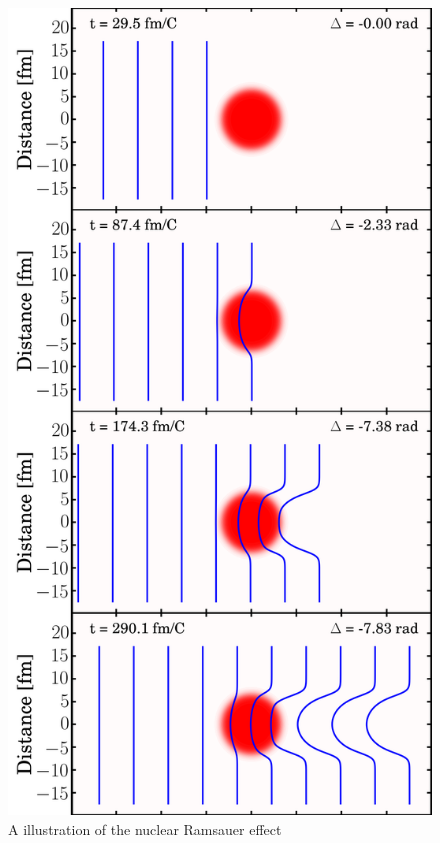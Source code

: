 \begin{figure}
    \hfill\begin{minipage}{0.5\textwidth}\centering
        \includegraphics[scale=0.2]{figures/phaseShiftStillsFigure.png}
        \caption{A illustration of the nuclear Ramsauer effect}
        \label{RamsauerPhaseShiftFigure}
    \end{minipage}
\end{figure}

